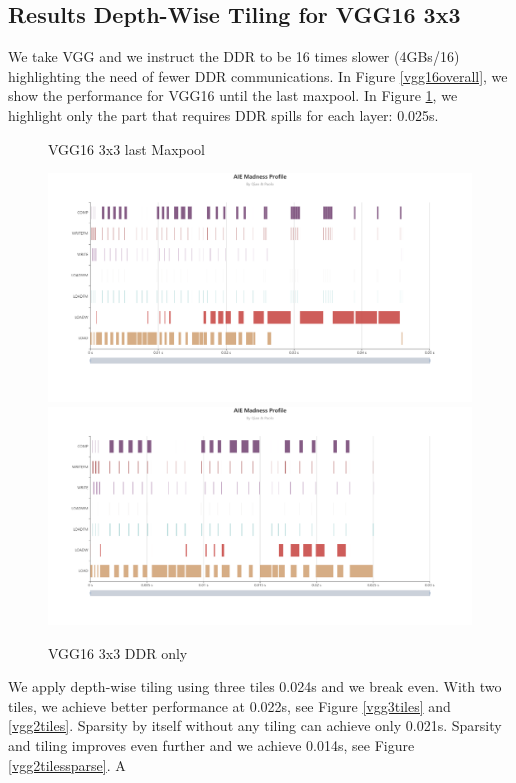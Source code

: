 \documentclass[conference]{IEEEtran}
\begin{document}
\subsection{Results Depth-Wise Tiling for VGG16 3x3}
\label{sec:res-depth}

We take VGG and we instruct the DDR to be 16 times slower (4GBs/16)
highlighting the need of fewer DDR communications.  In Figure
\ref{vgg16overall}, we show the performance for VGG16 until the last
maxpool. In Figure \ref{vggddronly}, we highlight only the part that
requires DDR spills for each layer: 0.025s.
\begin{figure}[htb]
\centering 
\caption{VGG16 3x3 last Maxpool}
\includegraphics[width=0.99\linewidth]{vgg16overall.png}
\label{vgg16overall}
\includegraphics[width=0.99\linewidth]{vggddronly.png}
\caption{VGG16 3x3 DDR only}
\label{vggddronly}
\end{figure}
We apply depth-wise tiling using three tiles 0.024s and we break
even. With two tiles, we achieve better performance at 0.022s, see
Figure \ref{vgg3tiles} and \ref{vgg2tiles}. Sparsity by itself without
any tiling can achieve only 0.021s. Sparsity and tiling improves even
further and we achieve 0.014s, see Figure \ref{vgg2tilessparse}. A
\end{document}
